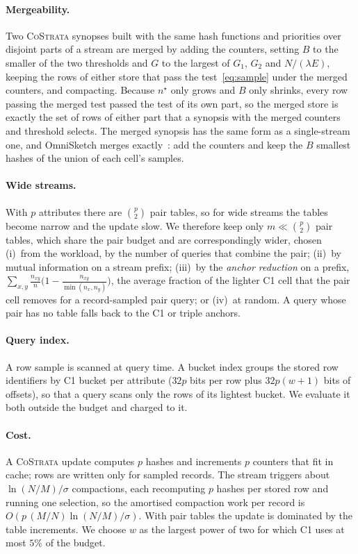 \documentclass[sigconf]{acmart}
\newcommand{\cs}{\textsc{CoStrata}\xspace}
\newcommand{\omni}{OmniSketch\xspace}
\newcommand{\nstar}{n^{\star}}
\begin{document}
\paragraph{Mergeability.} Two \cs synopses built with the same hash functions and priorities over disjoint
parts of a stream are merged by adding the counters, setting $B$ to the smaller of the two thresholds
and $G$ to the largest of $G_1$, $G_2$ and $N/(\lambda E)$, keeping the rows of either store that pass the test~\eqref{eq:sample}
under the merged counters, and compacting. Because $\nstar$ only grows and $B$ only shrinks, every row
passing the merged test passed the test of its own part, so the merged store is exactly the set of rows of
either part that a synopsis with the merged counters and threshold selects. The merged synopsis has the
same form as a single-stream one, and \omni merges exactly~\cite{mergeable}: add the counters and keep
the $B$ smallest hashes of the union of each cell's samples.

\paragraph{Wide streams.}\label{sec:wide} With $p$ attributes there are $\binom p2$ pair tables, so for
wide streams the tables become narrow and the update slow. We therefore keep only $m\ll\binom p2$ pair
tables, which share the pair budget and are correspondingly wider, chosen (i)~from the workload, by the
number of queries that combine the pair; (ii)~by mutual information on a stream prefix; (iii)~by the
\emph{anchor reduction} on a prefix, $\sum_{x,y}\frac{n_{xy}}{n}\bigl(1-\frac{n_{xy}}{\min(n_x,n_y)}\bigr)$,
the average fraction of the lighter C1 cell that the pair cell removes for a record-sampled pair query; or
(iv)~at random. A query whose pair has no table falls back to the C1 or triple anchors.

\paragraph{Query index.} A row sample is scanned at query time. A bucket index groups the stored row
identifiers by C1 bucket per attribute ($32p$ bits per row plus $32p(w+1)$ bits of offsets), so that a query
scans only the rows of its lightest bucket. We evaluate it both outside the budget and charged to it.

\paragraph{Cost.} A \cs update computes $p$ hashes and increments $p$ counters that fit in cache; rows are
written only for sampled records. The stream triggers about $\ln(N/M)/\sigma$ compactions, each
recomputing $p$ hashes per stored row and running one selection, so the amortised compaction work per
record is $O(p\,(M/N)\ln(N/M)/\sigma)$. With pair tables the update is dominated by the table increments.
We choose $w$ as the largest power of two for which C1 uses at most $5\%$ of the budget.
\end{document}
